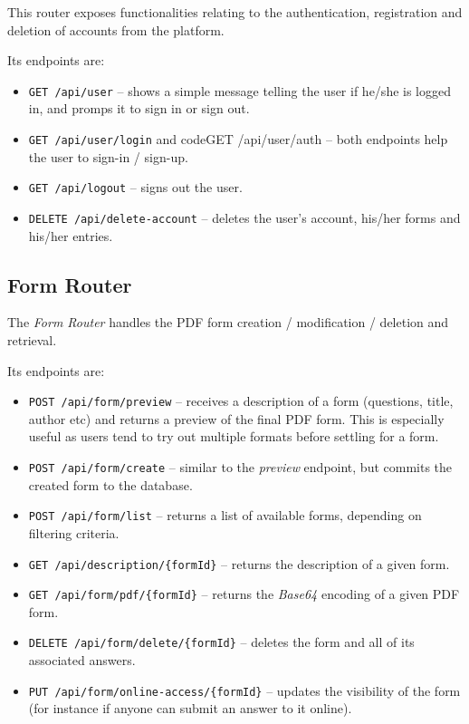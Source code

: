 \documentclass[11pt, a4paper]{report}
\def\code#1{\texttt{#1}}
\begin{document}
This router exposes functionalities relating to the authentication, registration and deletion of accounts from the platform.

Its endpoints are:
\begin{itemize}
    \item \code{GET /api/user} -- shows a simple message telling the user if he/she is logged in, and promps it to sign in or sign out.
    \item \code{GET /api/user/login} and code{GET /api/user/auth} -- both endpoints help the user to sign-in / sign-up.
    \item \code{GET /api/logout} -- signs out the user.
    \item \code{DELETE /api/delete-account} -- deletes the user's account, his/her forms and his/her entries.
\end{itemize}

\subsection{Form Router}

The \textit{Form Router} handles the PDF form creation / modification / deletion and retrieval.

Its endpoints are:
\begin{itemize}
    \item \code{POST /api/form/preview} -- receives a description of a form (questions, title, author etc) and returns a preview of the final PDF form. This is especially useful as users tend to try out multiple formats before settling for a form.
    \item \code{POST /api/form/create} -- similar to the \textit{preview} endpoint, but commits the created form to the database.
    \item \code{POST /api/form/list} -- returns a list of available forms, depending on filtering criteria.
    \item \code{GET /api/description/\{formId\}} -- returns the description of a given form.
    \item \code{GET /api/form/pdf/\{formId\}} -- returns the \textit{Base64} encoding of a given PDF form.
    \item \code{DELETE /api/form/delete/\{formId\}} -- deletes the form and all of its associated answers.
    \item \code{PUT /api/form/online-access/\{formId\}} -- updates the visibility of the form (for instance if anyone can submit an answer to it online).
\end{itemize}
\end{document}
